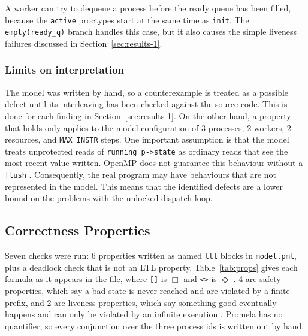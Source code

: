 \documentclass[10pt,a4paper]{article}
\newcommand{\always}{\ensuremath{\Box}}
\newcommand{\eventually}{\ensuremath{\Diamond}}
\newcommand{\code}[1]{\texttt{#1}}
\begin{document}
A worker can try to dequeue a process before the ready queue has been filled,
because the \code{active} proctypes start at the same time as \code{init}. 
The \code{empty(ready\_q)} branch handles this case, but it also 
causes the simple liveness failures discussed in Section~\ref{sec:results-1}.

\subsubsection*{Limits on interpretation}
\label{sec:limits-1}

The model was written by hand, so a counterexample is treated as a possible 
defect until its interleaving has been checked against the source code. 
This is done for each finding in Section~\ref{sec:results-1}. On the other 
hand, a property that holds only applies to the model configuration of 3 
processes, 2 workers, 2 resources, and \code{MAX\_INSTR} steps. One important 
assumption is that the model treats unprotected reads of 
\code{running\_p->state} as ordinary reads that see the most recent value 
written. OpenMP does not guarantee this behaviour without a 
\code{flush} \cite{openmp52}. Consequently, the real program may have behaviours 
that are not represented in the model. This means that the identified defects are a 
lower bound on the problems with the unlocked dispatch loop.

\subsection{Correctness Properties}
\label{sec:props-1}

Seven checks were run: 6 properties written as named \code{ltl} blocks in
\code{model.pml}, plus a deadlock check that is not an LTL property.
Table~\ref{tab:props} gives each formula as it appears in the file, where
\code{[]} is $\always$ and \code{<>} is $\eventually$ \cite{inggs_properties}. 4 are safety
properties, which say a bad state is never reached and are violated by a
finite prefix, and 2 are liveness properties, which say something good
eventually happens and can only be violated by an infinite execution
\cite{inggs_properties}. Promela has no quantifier, so every conjunction over
the three process ids is written out by hand.
\end{document}
